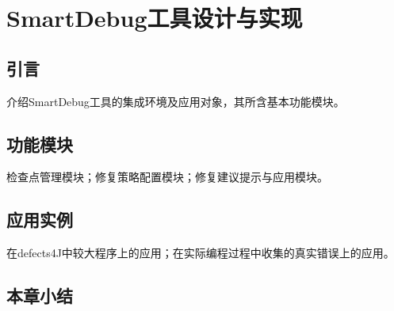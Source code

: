 \chapter{SmartDebug工具设计与实现}
\label{cha:impl}

\section{引言}%
介绍SmartDebug工具的集成环境及应用对象，其所含基本功能模块。
\section{功能模块}%
检查点管理模块；修复策略配置模块；修复建议提示与应用模块。
\section{应用实例}%
在defects4J中较大程序上的应用；在实际编程过程中收集的真实错误上的应用。
\section{本章小结}%